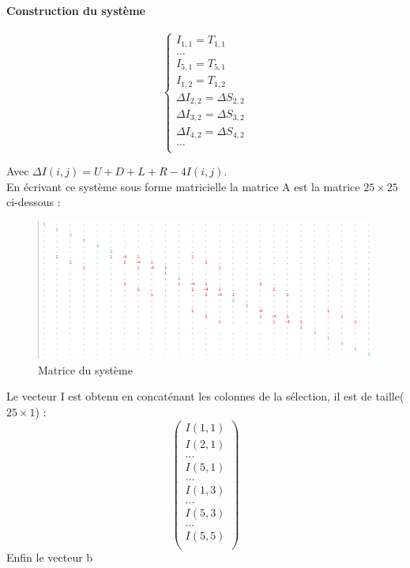 \paragraph{Construction du système}
\begin{center}
\begin{equation}
\left\{
\begin{aligned}
I_{1,1} = T_{1,1}\\
...\\
I_{5,1} = T_{5,1}\\
I_{1,2} = T_{1,2}\\
\Delta I_{2,2} = \Delta S_{2,2}\\
\Delta I_{3,2} = \Delta S_{3,2}\\
\Delta I_{4,2} = \Delta S_{4,2}\\
...\\
\end{aligned}
\right.
\end{equation}
\end{center}
Avec $\Delta I(i,j) = U+D+L+R-4I(i,j)$.\\
En écrivant ce système sous forme matricielle la matrice A est la matrice $25\times 25$ ci-dessous :  

\begin{figure}[!h]
\includegraphics[scale=0.5]{Images/matrice.png}
\caption{Matrice du système}
\end{figure}

Le vecteur I est obtenu en concaténant les colonnes de la sélection, il est de taille($25\times 1$) : 
\begin{equation}
\begin{pmatrix}
I(1,1)\\
I(2,1)\\
...\\
I(5,1)\\
...\\
I(1,3)\\
...\\
I(5,3)\\
...\\
I(5,5)\\
\end{pmatrix}
\end{equation}
Enfin le vecteur b 

